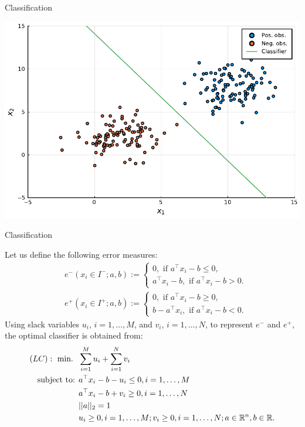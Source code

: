 \begin{frame}{Classification}

	\centering
	\includegraphics[width = \textwidth]{Figures/classes_with_classifier.pdf}

\end{frame}


\begin{frame}{Classification}

	Let us define the following \alert{error measures}:
	{\small
	\begin{align*}
		& e^-(x_i \in I^-; a, b) := \begin{cases} 0, \text{ if } a^\top x_i - b \leq 0, \\
	                                a^\top x_i - b, \text{ if } a^\top x_i - b > 0.
	                   \end{cases} \\
		& e^+(x_i \in I^+; a, b) := \begin{cases} 0, \text{ if } a^\top x_i - b \geq 0, \\
	                                b -  a^\top x_i, \text{ if } a^\top x_i - b < 0.
	                   \end{cases}                   
	\end{align*}}%
	\pause
	Using \alert{slack variables} $u_i$, $i = 1,\dots,M$, and $v_i$, $i = 1,\dots,N$, to represent $e^-$ and $e^+$, the optimal classifier is obtained from:
	{\small
	\begin{align*}
		(LC) :~ \mathop{\text{min.} \ } \ & \sum_{i=1}^M u_i + \sum_{i=1}^N v_i \\
		\mbox{subject to: } & a^\top x_i - b - u_i \leq 0, i = 1,\dots,M \\
		& a^\top x_i - b + v_i \geq 0, i = 1,\dots,N \\
		& ||a||_2 = 1\\
		&u_i \geq 0, i = 1,\dots,M; v_i \geq 0, i = 1,\dots,N; a \in \mathbb R^n, b \in \mathbb R.
	\end{align*}}
\end{frame}


